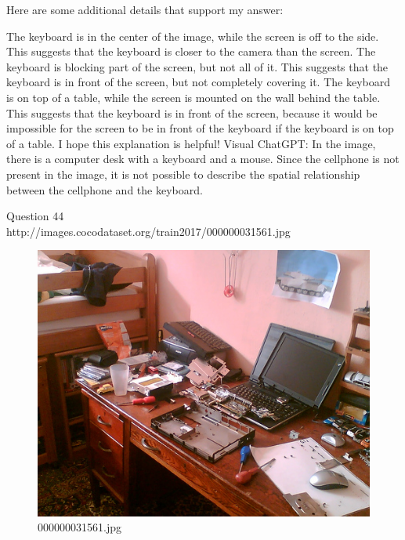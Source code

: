 \begin{enumerate}
    Here are some additional details that support my answer:
    
    The keyboard is in the center of the image, while the screen is off to the side. This suggests that the keyboard is closer to the camera than the screen.
    The keyboard is blocking part of the screen, but not all of it. This suggests that the keyboard is in front of the screen, but not completely covering it.
    The keyboard is on top of a table, while the screen is mounted on the wall behind the table. This suggests that the keyboard is in front of the screen, because it would be impossible for the screen to be in front of the keyboard if the keyboard is on top of a table.
    I hope this explanation is helpful!
    \subitem Visual ChatGPT: In the image, there is a computer desk with a keyboard and a mouse. Since the cellphone is not present in the image, it is not possible to describe the spatial relationship between the cellphone and the keyboard.
\end{enumerate}
Question 44\\
http://images.cocodataset.org/train2017/000000031561.jpg
\begin{figure}[h]
    \centering
    \includegraphics[width=0.8\linewidth]{../image set/hard/000000031561.jpg}
    \caption{000000031561.jpg}
\end{figure}
